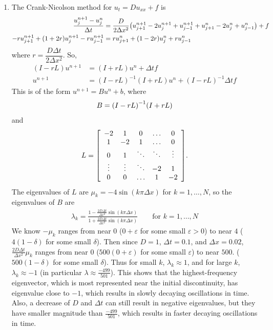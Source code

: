 \documentclass{article} %
\theoremstyle{plain}
\newcommand{\E}{\varepsilon}
\newcommand{\Dx}{\Delta x}
\newcommand{\Dt}{\Delta t}
\numberwithin{equation}{section} %
\numberwithin{figure}{section} %
\numberwithin{table}{section} %
\begin{document}
\begin{enumerate}[\ \ (a)]
    \item The Crank-Nicolson method for $u_t = Du_{xx} + f$ is
    \begin{align*}
        \frac{u_j^{n+1} - u_j^n}{\Dt} &= \frac{D}{2\Dx^2}\qty(u_{j+1}^{n+1} - 2u_j^{n+1} + u_{j-1}^{n+1} + u_{j+1}^n - 2u_j^n + u_{j-1}^n) + f \\
        -ru_{j+1}^{n+1} + \qty(1 + 2r)u_j^{n+1} - ru_{j-1}^{n+1} &= ru_{j+1}^n + (1 - 2r)u_j^n + ru_{j-1}^n
    \end{align*}
    where $r = \dfrac{D\Dt}{2\Dx^2}$.  So,
    \begin{align*}
        (I - rL)u^{n+1} &= (I + rL)u^n + \Dt f \\
        u^{n+1} &= (I - rL)^{-1}(I + rL)u^n + (I - rL)^{-1}\Dt f
    \end{align*}
    This is of the form $u^{n+1} = Bu^n + b$, where
    \begin{align*}
        B = \qty(I - rL)^{-1}\qty(I + rL)
    \end{align*}
    and
    \begin{align*}
        L = \qty[\begin{array}{ccccc}
            -2 & 1 & 0 & \dots & 0 \\
            1 & -2 & 1 & \dots & 0 \\
            0 & 1 & \ddots & \ddots & \vdots \\
            \vdots & \vdots & \ddots & -2 & 1 \\
            0 & 0 & \dots & 1 & -2
        \end{array}].
    \end{align*}
    The eigenvalues of $L$ are $\mu_k = -4\sin(k\pi \Dx)$ for $k = 1,\dots,N$, so the eigenvalues of $B$ are
    \begin{align*}
        \lambda_k = \frac{1 - \frac{2D\Dt}{\Dx^2}\sin(k\pi\Dx)}{1 + \frac{2D\Dt}{\Dx^2}\sin(k\pi\Dx)} \qquad \text{for }k = 1,\dots,N
    \end{align*}
    We know $-\mu_k$ ranges from near $0$ ($0 + \E$ for some small $\E>0$) to near $4$ ($4(1 - \delta)$ for some small $\delta$).  Then since $D = 1$, $\Dt = 0.1$, and $\Dx = 0.02$, $\frac{2D\Dt}{\Dx^2}\mu_k$ ranges from near $0$ ($500(0 + \E)$ for some small $\E$) to near $500$. ($500(1 - \delta)$ for some small $\delta$).  Thus for small $k$, $\lambda_k \approx 1$, and for large $k$, $\lambda_k \approx -1$ (in particular $\lambda \approx \frac{-499}{501}$).  This shows that the highest-frequency eigenvector, which is most represented near the initial discontinuity, has eigenvalue close to $-1$, which results in slowly decaying oscillations in time.  Also, a decrease of $D$ and $\Dt$ can still result in negative eigenvalues, but they have smaller magnitude than $\frac{-499}{501}$, which results in faster decaying oscillations in time.


\end{enumerate}
\end{document}
